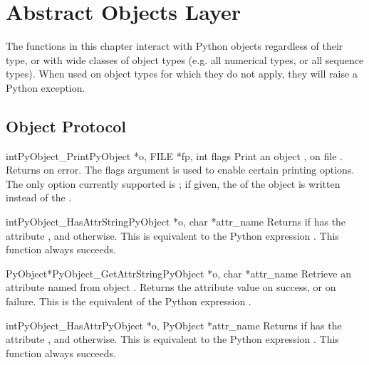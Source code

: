 \chapter{Abstract Objects Layer \label{abstract}}

The functions in this chapter interact with Python objects regardless
of their type, or with wide classes of object types (e.g. all
numerical types, or all sequence types).  When used on object types
for which they do not apply, they will raise a Python exception.


\section{Object Protocol \label{object}}

\begin{cfuncdesc}{int}{PyObject_Print}{PyObject *o, FILE *fp, int flags}
  Print an object , on file .  Returns  on
  error.  The flags argument is used to enable certain printing
  options.  The only option currently supported is
  ; if given, the  of the
  object is written instead of the .
\end{cfuncdesc}

\begin{cfuncdesc}{int}{PyObject_HasAttrString}{PyObject *o, char *attr_name}
  Returns  if  has the attribute , and
   otherwise.  This is equivalent to the Python expression
  .  This function always
  succeeds.
\end{cfuncdesc}

\begin{cfuncdesc}{PyObject*}{PyObject_GetAttrString}{PyObject *o,
                                                     char *attr_name}
  Retrieve an attribute named  from object .
  Returns the attribute value on success, or \NULL{} on failure.
  This is the equivalent of the Python expression
  .
\end{cfuncdesc}


\begin{cfuncdesc}{int}{PyObject_HasAttr}{PyObject *o, PyObject *attr_name}
  Returns  if  has the attribute , and
   otherwise.  This is equivalent to the Python expression
  .  This function always
  succeeds.
\end{cfuncdesc}


